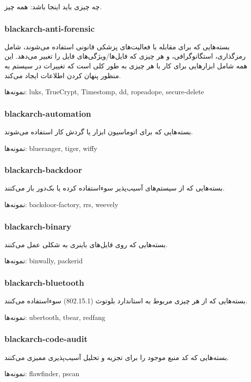 \documentclass[a4paper, oneside, 11pt]{book}
\begin{document}
چه چیزی باید اینجا باشد: همه چیز.

\subsubsection{blackarch-anti-forensic}
بسته‌هایی که برای مقابله با فعالیت‌های پزشکی قانونی استفاده می‌شوند،
شامل رمزگذاری، استگانوگرافی، و هر چیزی که فایل‌ها/ویژگی‌های فایل را تغییر می‌دهد.
این همه شامل ابزارهایی برای کار با هر چیزی به طور کلی است که تغییرات در سیستم
به منظور پنهان کردن اطلاعات ایجاد می‌کند.

نمونه‌ها: luks, TrueCrypt, Timestomp, dd, ropeadope, secure-delete

\subsubsection{blackarch-automation}
بسته‌هایی که برای اتوماسیون ابزار یا گردش کار استفاده می‌شوند.

نمونه‌ها: blueranger, tiger, wiffy

\subsubsection{blackarch-backdoor}
بسته‌هایی که از سیستم‌های آسیب‌پذیر سوءاستفاده کرده یا بک‌دور باز می‌کنند.

نمونه‌ها: backdoor-factory, rrs, weevely

\subsubsection{blackarch-binary}
بسته‌هایی که روی فایل‌های باینری به شکلی عمل می‌کنند.

نمونه‌ها: binwally, packerid

\subsubsection{blackarch-bluetooth}
بسته‌هایی که از هر چیزی مربوط به استاندارد بلوتوث (802.15.1) سوءاستفاده می‌کنند.

نمونه‌ها: ubertooth, tbear, redfang

\subsubsection{blackarch-code-audit}
بسته‌هایی که کد منبع موجود را برای تجزیه و تحلیل آسیب‌پذیری ممیزی می‌کنند.

نمونه‌ها: flawfinder, pscan
\end{document}
